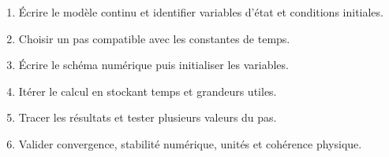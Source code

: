 \documentclass[10pt,a3paper]{article}
\begin{document}
\vfill
\begin{TLPosterMethode}
\begin{enumerate}
  \item Écrire le modèle continu et identifier variables d'état et conditions initiales.
  \item Choisir un pas compatible avec les constantes de temps.
  \item Écrire le schéma numérique puis initialiser les variables.
  \item Itérer le calcul en stockant temps et grandeurs utiles.
  \item Tracer les résultats et tester plusieurs valeurs du pas.
  \item Valider convergence, stabilité numérique, unités et cohérence physique.
\end{enumerate}
\end{TLPosterMethode}
\vfill
{}
\end{document}
